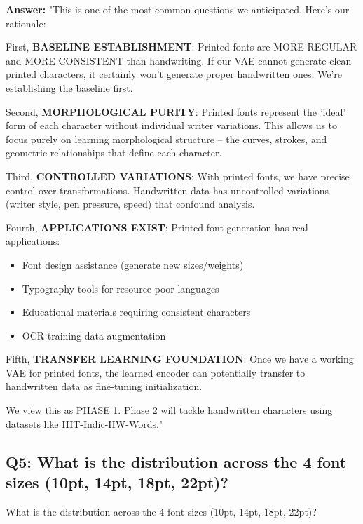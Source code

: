 \documentclass[11pt,a4paper]{article}
\begin{document}
\begin{answerbox}
\textbf{Answer:} "This is one of the most common questions we anticipated. Here's our rationale:

First, \textbf{BASELINE ESTABLISHMENT}: Printed fonts are MORE REGULAR and MORE CONSISTENT than handwriting. If our VAE cannot generate clean printed characters, it certainly won't generate proper handwritten ones. We're establishing the baseline first.

Second, \textbf{MORPHOLOGICAL PURITY}: Printed fonts represent the 'ideal' form of each character without individual writer variations. This allows us to focus purely on learning morphological structure -- the curves, strokes, and geometric relationships that define each character.

Third, \textbf{CONTROLLED VARIATIONS}: With printed fonts, we have precise control over transformations. Handwritten data has uncontrolled variations (writer style, pen pressure, speed) that confound analysis.

Fourth, \textbf{APPLICATIONS EXIST}: Printed font generation has real applications:
\begin{itemize}
\item Font design assistance (generate new sizes/weights)
\item Typography tools for resource-poor languages
\item Educational materials requiring consistent characters
\item OCR training data augmentation
\end{itemize}

Fifth, \textbf{TRANSFER LEARNING FOUNDATION}: Once we have a working VAE for printed fonts, the learned encoder can potentially transfer to handwritten data as fine-tuning initialization.

We view this as PHASE 1. Phase 2 will tackle handwritten characters using datasets like IIIT-Indic-HW-Words."
\end{answerbox}

\subsection{Q5: What is the distribution across the 4 font sizes (10pt, 14pt, 18pt, 22pt)?}

\begin{qbox}[title=Question]
What is the distribution across the 4 font sizes (10pt, 14pt, 18pt, 22pt)?
\end{qbox}
\end{document}
